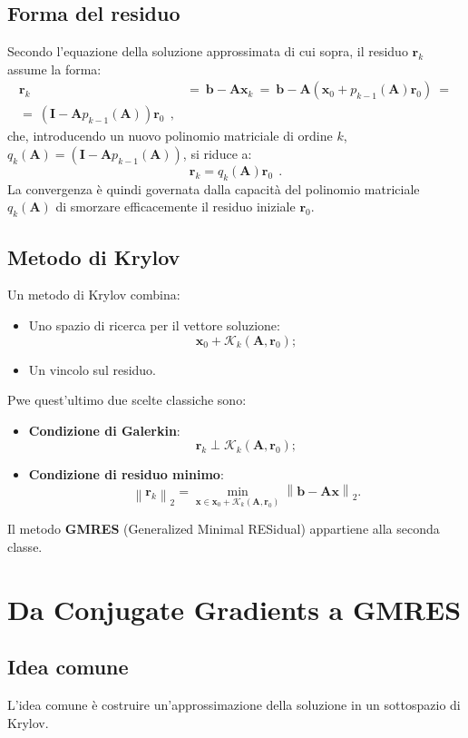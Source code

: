 \subsection{Forma del residuo}
Secondo l'equazione della soluzione approssimata di cui sopra, il residuo $\mathbf{r}_k$ assume la forma:
\[
\begin{aligned}
	\mathbf{r}_k\ &=\ \mathbf{b} - \mathbf{A} \mathbf{x}_k\ =\ \mathbf{b} - \mathbf{A} \left(\mathbf{x}_0 + p_{k-1}(\mathbf{A}) \mathbf{r}_0\right)\ = \\
	=\ \left(\mathbf{I} - \mathbf{A} p_{k-1}(\mathbf{A})\right) \mathbf{r}_0\ \ , 
\end{aligned}
\]
che, introducendo un nuovo polinomio matriciale di ordine $k$, $q_k(\mathbf{A}) = \left(\mathbf{I} - \mathbf{A} p_{k-1}(\mathbf{A})\right)$, si riduce a:
\[
\mathbf{r}_k = q_k(\mathbf{A}) \mathbf{r}_0\ \ . 
\]
La convergenza è quindi governata dalla capacità del polinomio matriciale $q_k(\mathbf{A})$ di smorzare efficacemente il residuo iniziale $\mathbf{r}_0$.

\subsection{Metodo di Krylov}
Un metodo di Krylov combina:
\begin{itemize}
	\item Uno spazio di ricerca per il vettore soluzione:
	\[
	\mathbf{x}_0 + \mathcal{K}_k(\mathbf{A}, \mathbf{r}_0); \tag{9}
	\]
	\item Un vincolo sul residuo.
\end{itemize}
Pwe quest'ultimo due scelte classiche sono:
\begin{itemize}
	\item \textbf{Condizione di Galerkin}:
	\[
	\mathbf{r}_k \perp \mathcal{K}_k(\mathbf{A}, \mathbf{r}_0); \tag{10}
	\]
	\item \textbf{Condizione di residuo minimo}:
	\[
	\left\| \mathbf{r}_k \right\|_2 = \min_{\mathbf{x} \in \mathbf{x}_0 + \mathcal{K}_k(\mathbf{A}, \mathbf{r}_0)} \left\| \mathbf{b} - \mathbf{A} \mathbf{x} \right\|_2. \tag{11}
	\]
\end{itemize}
Il metodo \textbf{GMRES} (Generalized Minimal RESidual) appartiene alla seconda classe.

%
%
%
\section{Da Conjugate Gradients a GMRES}
\subsection{Idea comune}
L'idea comune è costruire un'approssimazione della soluzione in un sottospazio di Krylov.

